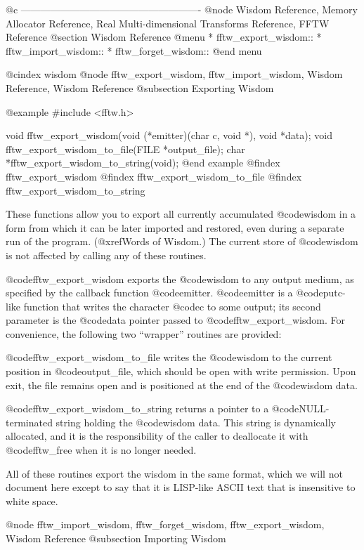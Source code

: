 @c -------------------------------------------------------
@node Wisdom Reference, Memory Allocator Reference, Real Multi-dimensional Transforms Reference, FFTW Reference
@section Wisdom Reference
@menu
* fftw_export_wisdom::          
* fftw_import_wisdom::          
* fftw_forget_wisdom::          
@end menu

@cindex wisdom
@node    fftw_export_wisdom, fftw_import_wisdom, Wisdom Reference, Wisdom Reference
@subsection Exporting Wisdom

@example
#include <fftw.h>

void fftw_export_wisdom(void (*emitter)(char c, void *), void *data);
void fftw_export_wisdom_to_file(FILE *output_file);
char *fftw_export_wisdom_to_string(void);
@end example
@findex fftw_export_wisdom
@findex fftw_export_wisdom_to_file
@findex fftw_export_wisdom_to_string

These functions allow you to export all currently accumulated
@code{wisdom} in a form from which it can be later imported and
restored, even during a separate run of the program. (@xref{Words of Wisdom}.)  The current store of @code{wisdom} is not
affected by calling any of these routines.

@code{fftw_export_wisdom} exports the @code{wisdom} to any output
medium, as specified by the callback function
@code{emitter}. @code{emitter} is a @code{putc}-like function that
writes the character @code{c} to some output; its second parameter is
the @code{data} pointer passed to @code{fftw_export_wisdom}.  For
convenience, the following two ``wrapper'' routines are provided:

@code{fftw_export_wisdom_to_file} writes the @code{wisdom} to the
current position in @code{output_file}, which should be open with write
permission.  Upon exit, the file remains open and is positioned at the
end of the @code{wisdom} data.

@code{fftw_export_wisdom_to_string} returns a pointer to a
@code{NULL}-terminated string holding the @code{wisdom} data. This
string is dynamically allocated, and it is the responsibility of the
caller to deallocate it with @code{fftw_free} when it is no longer
needed.

All of these routines export the wisdom in the same format, which we
will not document here except to say that it is LISP-like ASCII text
that is insensitive to white space.

@node    fftw_import_wisdom, fftw_forget_wisdom, fftw_export_wisdom, Wisdom Reference
@subsection Importing Wisdom

